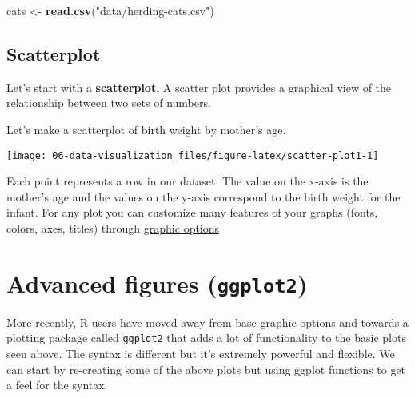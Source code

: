 \documentclass[11pt,]{article}
\newenvironment{Shaded}{\begin{snugshade}}{\end{snugshade}}
\newcommand{\DataTypeTok}[1]{\textcolor[rgb]{0.13,0.29,0.53}{#1}}
\newcommand{\KeywordTok}[1]{\textcolor[rgb]{0.13,0.29,0.53}{\textbf{#1}}}
\newcommand{\NormalTok}[1]{#1}
\newcommand{\OperatorTok}[1]{\textcolor[rgb]{0.81,0.36,0.00}{\textbf{#1}}}
\newcommand{\StringTok}[1]{\textcolor[rgb]{0.31,0.60,0.02}{#1}}
\begin{document}
\begin{Shaded}
\begin{Highlighting}[]
\NormalTok{cats <-}\StringTok{ }\KeywordTok{read.csv}\NormalTok{(}\StringTok{"data/herding-cats.csv"}\NormalTok{)}
\end{Highlighting}
\end{Shaded}

\hypertarget{scatterplot}{%
\subsection{Scatterplot}\label{scatterplot}}

Let's start with a \textbf{scatterplot}. A scatter plot provides a
graphical view of the relationship between two sets of numbers.

Let's make a scatterplot of birth weight by mother's age.

\begin{Shaded}
\end{Shaded}

\begin{center}\texttt{[image: 06-data-visualization\_files/figure-latex/scatter-plot1-1]} \end{center}

Each point represents a row in our dataset. The value on the x-axis is
the mother's age and the values on the y-axis correspond to the birth
weight for the infant. For any plot you can customize many features of
your graphs (fonts, colors, axes, titles) through
\href{http://www.statmethods.net/advgraphs/parameters.html}{graphic
options}

\hypertarget{advanced-figures-ggplot2}{%
\section{\texorpdfstring{Advanced figures
(\texttt{ggplot2})}{Advanced figures (ggplot2)}}\label{advanced-figures-ggplot2}}

More recently, R users have moved away from base graphic options and
towards a plotting package called \texttt{ggplot2} that adds a lot of
functionality to the basic plots seen above. The syntax is different but
it's extremely powerful and flexible. We can start by re-creating some
of the above plots but using ggplot functions to get a feel for the
syntax.
\end{document}
